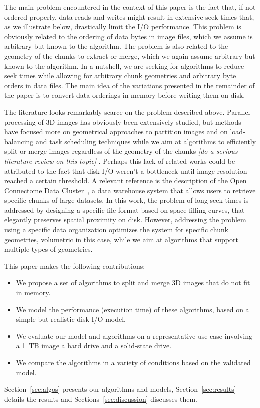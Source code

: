 \documentclass[10pt, conference, compsocconf]{IEEEtran}
\newcommand{\todo}[1]{
  \color{red}\emph{[#1]}
  \color{black}
}
\begin{document}
The main problem encountered in the context of this paper is the fact
that, if not ordered properly, data reads and writes might result in
extensive seek times that, as we illustrate below, drastically limit
the I/O performance. This problem is obviously related to the ordering
of data bytes in image files, which we assume is arbitrary but known
to the algorithm. The problem is also related to the geometry of the
chunks to extract or merge, which we again assume arbitrary but known
to the algorithm. In a nutshell, we are seeking for algorithms to
reduce seek times while allowing for arbitrary chunk geometries and
arbitrary byte orders in data files. The main idea of the variations
presented in the remainder of the paper is to convert data orderings
in memory before writing them on disk. 

The literature looks remarkably scarce on the problem described
above. Parallel processing of 3D images has obviously been extensively
studied, but methods have focused more on geometrical approaches to
partition images and on load-balancing and task scheduling techniques
while we aim at algorithms to efficiently split or merge images
regardless of the geometry of the chunks \todo{do a serious literature
review on this topic}. Perhaps this lack of related works could be
attributed to the fact that disk I/O weren't a bottleneck until image
resolution reached a certain threshold. A relevant reference is the
description of the Open Connectome Data Cluster~\cite{burns2013open},
a data warehouse system that allows users to retrieve specific chunks
of large datasets. In this work, the problem of long seek times is
addressed by designing a specific file format based on space-filling
curves, that elegantly preserves spatial proximity on disk. However,
addressing the problem using a specific data organization optimizes
the system for specific chunk geometries, volumetric in this case,
while we aim at algorithms that support multiple types of geometries.

This paper makes the following contributions:
\begin{itemize}
  \item We propose a set of algorithms to split and merge 3D images
    that do not fit in memory.
  \item We model the performance (execution time) of these algorithms,
    based on a simple but realistic disk I/O model.
  \item We evaluate our model and algorithms on a representative
    use-case involving a 1~TB image a hard drive and a solid-state
    drive.
  \item We compare the algorithms in a variety of conditions based on the validated model.
\end{itemize}
Section~\ref{sec:algos} presents our algorithms and models,
Section~\ref{sec:results} details the results and
Sections~\ref{sec:discussion} discusses them.
\end{document}
